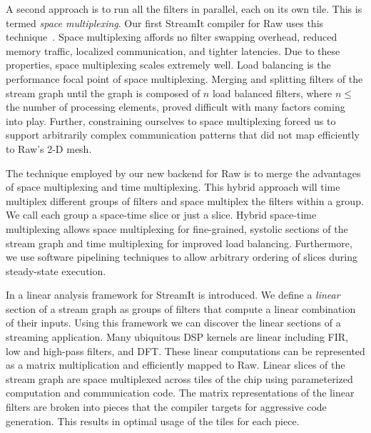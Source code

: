 \documentclass{csailabstractbook}
\begin{document}
A second approach is to run all the filters in parallel, each on its
own tile.  This is termed {\it space multiplexing}.  Our first
StreamIt compiler for Raw uses this technique~\cite{streamit-asplos}.
Space multiplexing affords no filter swapping overhead, reduced memory
traffic, localized communication, and tighter latencies.  Due to these
properties, space multiplexing scales extremely well.  Load balancing
is the performance focal point of space multiplexing.  Merging and
splitting filters of the stream graph until the graph is composed of
$n$ load balanced filters, where $n \le$ the number of processing elements,
proved difficult with many factors coming into play.  Further,
constraining ourselves to space multiplexing forced us to support
arbitrarily complex communication patterns that did not map
efficiently to Raw's 2-D mesh.

The technique employed by our new backend for Raw is to merge the
advantages of space multiplexing and time multiplexing.  This hybrid
approach will time multiplex different groups of filters and space
multiplex the filters within a group. We call each group a space-time
slice or just a slice.  Hybrid space-time multiplexing allows space
multiplexing for fine-grained, systolic sections of the stream graph
and time
multiplexing for improved load balancing.  Furthermore, we use
software pipelining techniques to allow arbitrary ordering of slices
during steady-state execution.

In \cite{lamb03} a linear analysis framework for StreamIt is
introduced.  We define a {\it linear} section of a stream graph as
groups of filters that compute a linear combination of their inputs.
Using this framework we can discover the linear sections of a
streaming application.  Many ubiquitous DSP kernels are linear
including FIR, low and high-pass filters, and DFT.  These linear
computations can be represented as a matrix multiplication and
efficiently mapped to Raw.  Linear slices of the stream
graph are space multiplexed across tiles of the chip using
parameterized computation and communication code.  The matrix
representations of the linear filters are broken into pieces
that the compiler targets for aggressive code generation.  This
results in optimal usage of the tiles for each piece.
\end{document}
